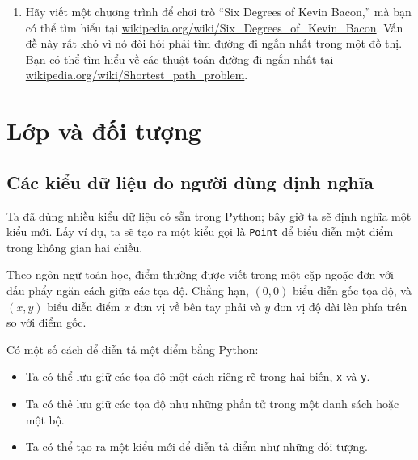 \documentclass[11pt]{book}
\begin{document}
\begin{ex}
\begin{enumerate}

\item Hãy viết một chương trình để chơi trò ``Six Degrees of Kevin
  Bacon,'' mà bạn có thể tìm hiểu tại
  \url{wikipedia.org/wiki/Six_Degrees_of_Kevin_Bacon}.  Vấn đề này
  rất khó vì nó đòi hỏi phải tìm đường đi ngắn nhất trong một đồ thị.
  Bạn có thể tìm hiểu về các thuật toán đường đi ngắn nhất tại 
  \url{wikipedia.org/wiki/Shortest_path_problem}.

\end{enumerate}

\end{ex}


\chapter{Lớp và đối tượng}


\section{Các kiểu dữ liệu do người dùng định nghĩa}
\label{point}


Ta đã dùng nhiều kiểu dữ liệu có sẵn trong Python; bây giờ ta sẽ 
định nghĩa một kiểu mới. Lấy ví dụ, ta sẽ tạo ra một kiểu gọi 
là {\tt Point} để biểu diễn một điểm trong không gian hai chiều.


Theo ngôn ngữ toán học, điểm thường được viết trong một cặp
ngoặc đơn với dấu phẩy ngăn cách giữa các tọa độ. Chẳng hạn,
$(0, 0)$ biểu diễn gốc tọa độ, và $(x, y)$ biểu diễn
điểm $x$ đơn vị về bên tay phải và $y$ đơn vị độ dài lên phía trên
so với điểm gốc.

Có một số cách để diễn tả một điểm bằng Python:

\begin{itemize}

\item Ta có thể lưu giữ các tọa độ một cách riêng rẽ trong hai
biến, {\tt x} và {\tt y}.

\item Ta có thẻ lưu giữ các tọa độ như những phần tử trong một danh sách
hoặc một bộ.

\item Ta có thể tạo ra một kiểu mới để diễn tả điểm như những đối tượng.

\end{itemize}
\end{document}
